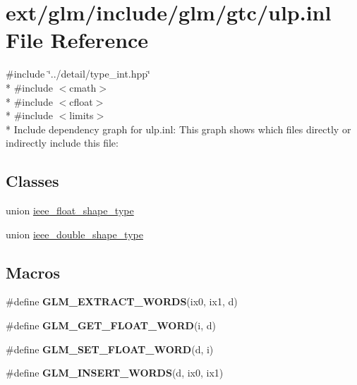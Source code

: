\hypertarget{ulp_8inl}{\section{ext/glm/include/glm/gtc/ulp.inl File Reference}
\label{ulp_8inl}
}
{\ttfamily \#include \char`\"{}../detail/type\-\_\-int.\-hpp\char`\"{}}\\*
{\ttfamily \#include $<$cmath$>$}\\*
{\ttfamily \#include $<$cfloat$>$}\\*
{\ttfamily \#include $<$limits$>$}\\*
Include dependency graph for ulp.\-inl\-:
This graph shows which files directly or indirectly include this file\-:
\subsection*{Classes}
\begin{DoxyCompactItemize}
\item 
union \hyperlink{unionieee__float__shape__type}{ieee\-\_\-float\-\_\-shape\-\_\-type}
\item 
union \hyperlink{unionieee__double__shape__type}{ieee\-\_\-double\-\_\-shape\-\_\-type}
\end{DoxyCompactItemize}
\subsection*{Macros}
\begin{DoxyCompactItemize}
\item 
\#define {\bfseries G\-L\-M\-\_\-\-E\-X\-T\-R\-A\-C\-T\-\_\-\-W\-O\-R\-D\-S}(ix0, ix1, d)
\item 
\#define {\bfseries G\-L\-M\-\_\-\-G\-E\-T\-\_\-\-F\-L\-O\-A\-T\-\_\-\-W\-O\-R\-D}(i, d)
\item 
\#define {\bfseries G\-L\-M\-\_\-\-S\-E\-T\-\_\-\-F\-L\-O\-A\-T\-\_\-\-W\-O\-R\-D}(d, i)
\item 
\#define {\bfseries G\-L\-M\-\_\-\-I\-N\-S\-E\-R\-T\-\_\-\-W\-O\-R\-D\-S}(d, ix0, ix1)
\end{DoxyCompactItemize}
